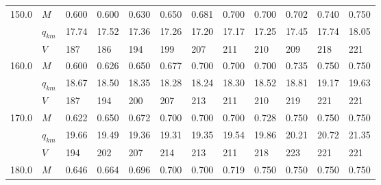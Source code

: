 \documentclass{article}
\begin{document}
\begin{tabular}{llllllllllll}
150.0 & $M$ &  0.600  &                   0.600  &                   0.630  &                   0.650  &                   0.681  &  0.700 \cellcolor{green} &                   0.700  &                   0.702  &  0.740  &  0.750  \\
      & $q_{km}$ &  17.74  &                   17.52  &                   17.36  &                   17.26  &                   17.20  &  17.17 \cellcolor{green} &                   17.25  &                   17.45  &  17.74  &  18.05  \\
      & $V$ &    187  &                     186  &                     194  &                     199  &                     207  &    211 \cellcolor{green} &                     210  &                     209  &    218  &    221  \\
160.0 & $M$ &  0.600  &                   0.626  &                   0.650  &                   0.677  &  0.700 \cellcolor{green} &                   0.700  &                   0.700  &                   0.735  &  0.750  &  0.750  \\
      & $q_{km}$ &  18.67  &                   18.50  &                   18.35  &                   18.28  &  18.24 \cellcolor{green} &                   18.30  &                   18.52  &                   18.81  &  19.17  &  19.63  \\
      & $V$ &    187  &                     194  &                     200  &                     207  &    213 \cellcolor{green} &                     211  &                     210  &                     219  &    221  &    221  \\
170.0 & $M$ &  0.622  &                   0.650  &                   0.672  &  0.700 \cellcolor{green} &                   0.700  &                   0.700  &                   0.728  &                   0.750  &  0.750  &  0.750  \\
      & $q_{km}$ &  19.66  &                   19.49  &                   19.36  &  19.31 \cellcolor{green} &                   19.35  &                   19.54  &                   19.86  &                   20.21  &  20.72  &  21.35  \\
      & $V$ &    194  &                     202  &                     207  &    214 \cellcolor{green} &                     213  &                     211  &                     218  &                     223  &    221  &    221  \\
180.0 & $M$ &  0.646  &                   0.664  &  0.696 \cellcolor{green} &                   0.700  &                   0.700  &                   0.719  &                   0.750  &                   0.750  &  0.750  &  0.750  \\

\end{tabular}
\end{document}
